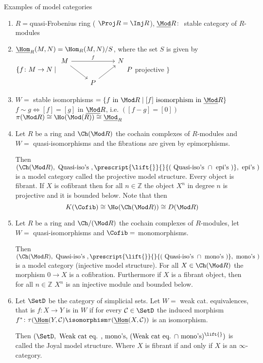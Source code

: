 \begin{exmp}
    Examples of model categories
    \begin{enumerate}
        \item 
        $R=$quasi-Frobenius ring ( $\Proj R = \Inj R$), $\underline{\Mod} R\colon$ stable category of $R$-modules 
        \item 
        $\underline{\Hom}_R(M,N)=\Hom_R(M,N)/S$, where the set $S$ is given by $\{f \colon M \to N \mid 
        \begin{tikzcd}
            M 
            \ar[rr, "f"]
            \ar[rd]
            &&
            N
            \\
            &
            P 
            \ar[ru]
        \end{tikzcd}
        P$ projective $\}$
        \item 
        $W=$ stable isomorphisms $=\{ f \text{ in } \Mod R \mid [f] \text{ isomorphism in } \underline{\Mod} R\}$
        $f \sim g \iff [f] = [g]$ in $\underline{\Mod} R$, i.e. $([f-g]=[0])$
        $\pi(\Mod R) \cong \Ho(\Mod(R)) \cong \underline{\Mod}_R$
        \item
        Let $R$ be a ring and $\Ch(\Mod R)$ the cochain complexes of $R$-modules and $W=$ quasi-isomorphisms and the fibrations are given by epimorphisms.
        
        Then $(\Ch(\Mod R), \text{ Quasi-iso's }, \prescript{\lift{}}{}{(\text{ Quasi-iso's } \cap \text{ epi's })}, \text{ epi's })$ is a model category called the projective model structure.
        Every object is fibrant. 
        If $X$ is cofibrant then for all $n \in \mathbb{Z}$ the object $X^n$ in degree $n$ is projective and it is bounded below.
        Note that then 
        \[
        K(\Cofib) \cong \Ho(\Ch(\Mod R)) \cong D ( \Mod R)
        \]
        \item 
        Let $R$ be a ring and $\Ch/( \Mod R)$ the cochain complexes of $R$-modules, let $W=$ quasi-isomorphisms and $\Cofib=$ monomorphisms.
        
        Then $(\Ch(\Mod R), \text{ Quasi-iso's }, \prescript{\lift{}}{}{(\text{ Quasi-iso's } \cap \text{ mono's })}, \text{ mono's })$ is a model category (injective model structure).
        For all $X \in  \Ch( \Mod R)$ the morphism $0 \to X$ is a cofibration.
        Furthermore if $X$ is a fibrant object, then for all $n \in  \mathbb{Z}$ $X^n$ is an injective module and bounded below.
        \item 
        Let $\SetD$ be the category of simplicial sets.
        Let $W=$ weak cat. equivalences, that is $f\colon X\to Y$ is in $W$ if for every $\mathcal{C} \in \SetD$ the induced morphism $f^*\colon \tau( \underline{\Hom}(Y, \mathcal{C}) \isomorphism \tau(\underline{\Hom}(X, \mathcal{C}))$ is an isomorphism.

        Then $(\SetD, \text{ Weak cat eq. , mono's, (Weak cat eq. $\cap$ mono's)$^{\lift{}}$})$ is called the Joyal model structure.
        Where $X$ is fibrant if and only if $X$ is an $\infty$-category.  
    \end{enumerate}
\end{exmp}